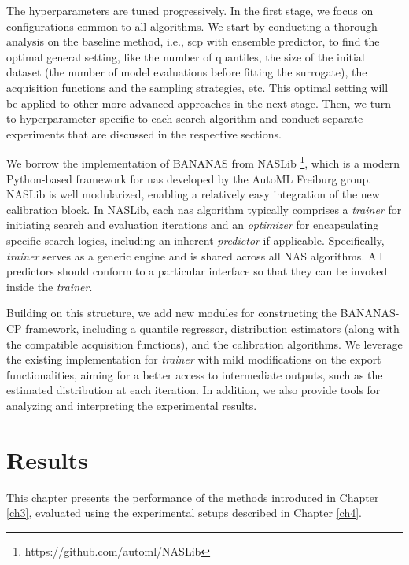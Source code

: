\documentclass[a4paper,oneside,bibliography=totoc]{scrbook}
\begin{document}
The hyperparameters are tuned progressively. In the first stage, we focus on configurations common to all algorithms. We start by conducting a thorough analysis on the baseline method, i.e., \gls{scp} with ensemble predictor, to find the optimal general setting, like the number of quantiles, the size of the initial dataset (the number of model evaluations before fitting the surrogate), the acquisition functions and the sampling strategies, etc. This optimal setting will be applied to other more advanced approaches in the next stage. Then, we turn to hyperparameter specific to each search algorithm and 
	conduct separate experiments that are  discussed in the respective sections.

\vspace{0.2em}
We borrow the implementation of BANANAS from NASLib \footnote{https://github.com/automl/NASLib}, which is a modern Python-based framework for \gls{nas} developed by the AutoML Freiburg group. NASLib is well modularized, enabling a relatively easy integration of the new calibration block. In NASLib, each \gls{nas} algorithm typically comprises a \textit{trainer} for initiating search and evaluation iterations and an \textit{optimizer} for encapsulating specific search logics, including an inherent \textit{predictor} if applicable. Specifically, \textit{trainer} serves as a generic engine and is shared across all NAS algorithms. All predictors should conform to a particular interface so that they can be invoked inside the \textit{trainer}. 

\vspace{0.2em}
Building on this structure, we add new modules for constructing the BANANAS-CP framework, including a quantile regressor, distribution estimators (along with the compatible acquisition functions), and the calibration algorithms. We leverage the existing implementation for \textit{trainer} with mild modifications on the export functionalities, aiming for a better access to intermediate outputs, such as the estimated distribution at each iteration. In addition, we also provide tools for analyzing and interpreting the experimental results.

\chapter{Results}
This chapter presents the performance of the methods introduced in Chapter \ref{ch3}, evaluated using the experimental setups described in Chapter \ref{ch4}. 
\end{document}
